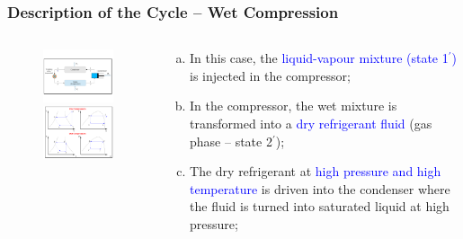 \documentclass[10pt,compress,handout,ignorenonframetext]{beamer}
\begin{document}
\begin{frame}
 \frametitle{Description of the Cycle -- Wet Compression}
  \begin{columns}
   \begin{column}[c]{0.5\linewidth}
    \begin{figure}%
     \vbox{
      \includegraphics[width=5.5cm,clip]{./Pics/Overview_Refrig12}
      \vspace{-.5cm}
      \includegraphics[width=4.5cm,clip]{./Pics/Overview_Refrig13}}
    \end{figure}  
   \end{column}  
   \begin{column}[c]{0.5\linewidth}
  \begin{enumerate}[(a)]
   \item <1-> In this case, the \textcolor{blue}{liquid-vapour mixture (state 1$^{\prime}$)} is injected in the compressor;
   \item <2-> In the compressor, the wet mixture is transformed into a \textcolor{blue}{dry refrigerant fluid} (gas phase -- state 2$^{\prime}$);
   \item <3-> The dry refrigerant at \textcolor{blue}{high pressure and high temperature} is driven into the condenser where the fluid is turned into saturated liquid at high pressure;
  \end{enumerate}
 \end{column}  
\end{columns}
\end{frame}
\end{document}
